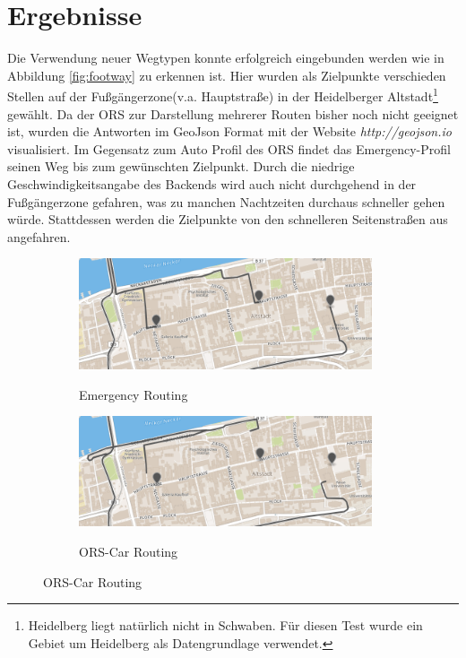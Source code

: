 \section{Ergebnisse}

Die Verwendung neuer Wegtypen konnte erfolgreich eingebunden werden wie in Abbildung \ref{fig:footway} zu erkennen ist.
Hier wurden als Zielpunkte verschieden Stellen auf der Fußgängerzone(v.a. Hauptstraße) in der Heidelberger Altstadt\footnote{Heidelberg liegt natürlich nicht in Schwaben.
Für diesen Test wurde ein Gebiet um Heidelberg als Datengrundlage verwendet.} gewählt.
Da der ORS zur Darstellung mehrerer Routen bisher noch nicht geeignet ist, wurden die Antworten im GeoJson Format mit der Website \textit{http://geojson.io} visualisiert.
Im Gegensatz zum Auto Profil des ORS findet das Emergency-Profil seinen Weg bis zum gewünschten Zielpunkt.
Durch die niedrige Geschwindigkeitsangabe des Backends wird auch nicht durchgehend in der Fußgängerzone gefahren, was zu manchen Nachtzeiten durchaus schneller gehen würde.
Stattdessen werden die Zielpunkte von den schnelleren Seitenstraßen aus angefahren.

\begin{figure}[h]
\centering
\caption{Routing in die Fußgängerzone der Heidelberger Altstadt}
\label{fig:footway}
\begin{subfigure}{0.49\textwidth}
\centering
\includegraphics[width = 0.95\textwidth]{../media/Altstadt_emergency.png} \\
\caption{Emergency Routing}
\label{fig:alteme}
\end{subfigure}
\begin{subfigure}{0.49\textwidth}
\centering
\includegraphics[width = 0.95\textwidth]{../media/Altstadt_car.png} \\
\caption{ORS-Car Routing}
\label{fig:altcar}
\end{subfigure}
\end{figure}

